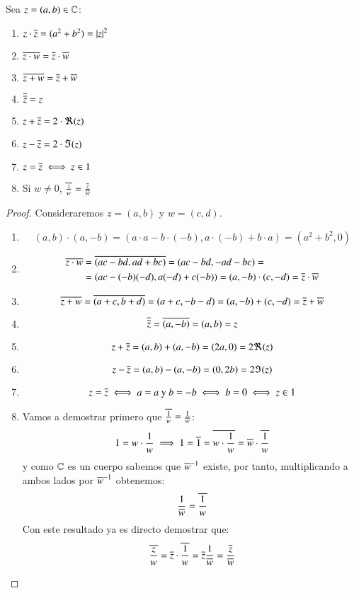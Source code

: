     \begin{pro}
        Sea $z = (a, b) \in \mathbb{C}$:\\
        \begin{enumerate}[(1)]
            \item $z \cdot \overline{z} = (a^2 + b^2) = \left|z\right|^2$
            \item $\overline{z \cdot w} = \overline{z} \cdot \overline{w}$
            \item $\overline{z + w} = \overline{z} + \overline{w}$
            \item $\overline{\overline{z}} = z$
            \item $z + \overline{z} = 2 \cdot \Re(z)$
            \item $z - \overline{z} = 2 \cdot \Im(z)$
            \item $z = \overline{z} \iff z \in 1$
            \item Si $w \neq 0$, $\overline{\frac{z}{w}} = \frac{\overline{z}}{\overline{w}}$
        \end{enumerate}
    \end{pro}
    \begin{proof} Consideraremos $z = (a, b)$ y $w = (c, d)$.
        \begin{enumerate}
            \item $$(a, b) \cdot (a, -b) = (a \cdot a - b \cdot(-b), a \cdot (-b) + b \cdot a) = (a^2 + b^2, 0)$$
            \item
            \begin{align*}
                \overline{z\cdot w} &= \overline{(ac - bd, ad + bc)} = (ac - bd, -ad -bc) =\\
                &= (ac - (-b) (-d), a(-d) + c(-b)) = (a, -b) \cdot (c, -d) = \overline{z} \cdot \overline{w}
            \end{align*}
            \item $$
                \overline{z + w} = \overline{(a + c, b + d)} = (a + c, -b -d) = (a, -b) + (c, -d) = \overline{z} + \overline{w}
                $$
            \item $$\overline{\overline{z}} = \overline{(a, -b)} = (a, b) = z$$
            \item $$z + \overline{z} = (a, b) + (a, - b) = (2a, 0) = 2 \Re(z)$$
            \item $$z - \overline{z} = (a, b) - (a, - b) = (0, 2b) = 2 \Im(z)$$
            \item $$ z = \overline{z} \iff a = a \text{ y } b = -b \iff b = 0 \iff z \in 1$$
            \item Vamos a demostrar primero que $\overline{\frac{1}{w}} = \frac{1}{\overline{w}}$:
            $$
                1 = w \cdot \frac{1}{w} \implies 1 = \overline{1} = \overline{w \cdot \frac{1}{w}} = \overline{w} \cdot \overline{\frac{1}{w}}
            $$
            y como $\mathbb{C}$ es un cuerpo sabemos que $\overline{w}^{-1}$ existe, por tanto, multiplicando a ambos lados por $\overline{w}^{-1}$ obtenemos:
            $$
                \frac{1}{\overline{w}} = \overline{\frac{1}{w}}
            $$
            Con este resultado ya es directo demostrar que:
            $$
                \overline{\frac{z}{w}} = \overline{z} \cdot \overline{\frac{1}{w}} = \overline{z} \frac{1}{\overline{w}} = \frac{\overline{z}}{\overline{w}}
            $$
        \end{enumerate}
    \end{proof}

